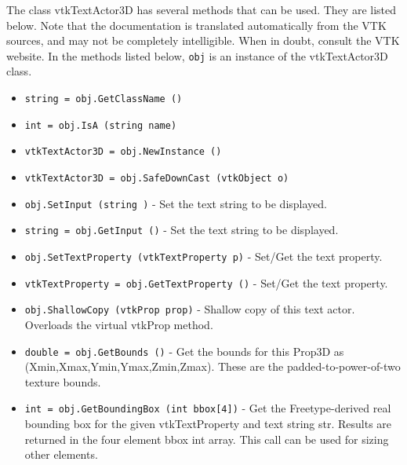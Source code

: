 The class vtkTextActor3D has several methods that can be used.
  They are listed below.
Note that the documentation is translated automatically from the VTK sources,
and may not be completely intelligible.  When in doubt, consult the VTK website.
In the methods listed below, \verb|obj| is an instance of the vtkTextActor3D class.
\begin{itemize}
\item  \verb|string = obj.GetClassName ()|

\item  \verb|int = obj.IsA (string name)|

\item  \verb|vtkTextActor3D = obj.NewInstance ()|

\item  \verb|vtkTextActor3D = obj.SafeDownCast (vtkObject o)|

\item  \verb|obj.SetInput (string )| -  Set the text string to be displayed.

\item  \verb|string = obj.GetInput ()| -  Set the text string to be displayed.

\item  \verb|obj.SetTextProperty (vtkTextProperty p)| -  Set/Get the text property.

\item  \verb|vtkTextProperty = obj.GetTextProperty ()| -  Set/Get the text property.

\item  \verb|obj.ShallowCopy (vtkProp prop)| -  Shallow copy of this text actor. Overloads the virtual
 vtkProp method.

\item  \verb|double = obj.GetBounds ()| -  Get the bounds for this Prop3D as (Xmin,Xmax,Ymin,Ymax,Zmin,Zmax).  
 These are the padded-to-power-of-two texture bounds.

\item  \verb|int = obj.GetBoundingBox (int bbox[4])| -  Get the Freetype-derived real bounding box for the given vtkTextProperty
 and text string str.  Results are returned in the four element bbox int
 array.  This call can be used for sizing other elements.

\end{itemize}

